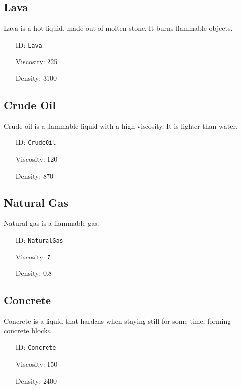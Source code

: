 \subsection{Lava}\label{subsec:liquids_lava}
Lava is a hot liquid, made out of molten stone. It burns flammable objects.
\newline
\begin{itemize}[nosep]
    \item[ID:] \texttt{Lava}
    \item[Viscosity:] 225
    \item[Density:] 3100
\end{itemize}

\subsection{Crude Oil}\label{subsec:liquids_crude oil}
Crude oil is a flammable liquid with a high viscosity. It is lighter than water.
\newline
\begin{itemize}[nosep]
    \item[ID:] \texttt{CrudeOil}
    \item[Viscosity:] 120
    \item[Density:] 870
\end{itemize}

\subsection{Natural Gas}\label{subsec:liquids_natural gas}
Natural gas is a flammable gas.
\newline
\begin{itemize}[nosep]
    \item[ID:] \texttt{NaturalGas}
    \item[Viscosity:] 7
    \item[Density:] 0.8
\end{itemize}

\subsection{Concrete}\label{subsec:liquids_concrete}
Concrete is a liquid that hardens when staying still for some time, forming concrete blocks.
\newline
\begin{itemize}[nosep]
    \item[ID:] \texttt{Concrete}
    \item[Viscosity:] 150
    \item[Density:] 2400
\end{itemize}

